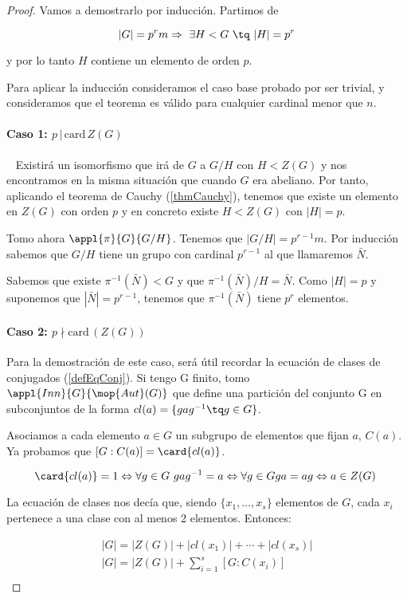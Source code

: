 \documentclass[nochap]{apuntes}
\begin{document}
\begin{proof}
 Vamos a demostrarlo por inducción. Partimos de

 \[ |G|=p^{r}m \Rightarrow \ \exists H < G \ \tq \ |H|=p^{r} \]

 y por lo tanto $H$ contiene un elemento de orden $p$.

 Para aplicar la inducción consideramos el caso base probado por ser trivial, y consideramos que el teorema es válido para cualquier cardinal menor que $n$.
\paragraph{Caso 1: $p\,|\, \mathrm{card}\, Z(G)$}  \pbreak
     Existirá un isomorfismo que irá de $G$ a $G/H$ con $H < Z(G)$ y nos encontramos en la misma situación que cuando $G$ era abeliano.
    Por tanto, aplicando el teorema de Cauchy (\ref{thmCauchy}), tenemos que existe un elemento en $Z(G)$ con orden $p$ y en concreto existe $H < Z(G)$ con $|H|=p$.

    Tomo ahora $\appl{\pi}{G}{G/H}$. Tenemos que $|G/H|=p^{r-1}m$. Por inducción sabemos que $G/H$ tiene un grupo con cardinal $p^{r-1}$ al que llamaremos $\bar{N}$.

    Sabemos que existe $\pi^{-1}(\bar{N}) < G$  y que $\pi^{-1}(\bar{N}) /H=\bar{N}$. Como $|H|=p$ y suponemos que $|\bar{N}|=p^{r-1}$, tenemos que $\pi^{-1}(\bar{N})$ tiene $p^{r}$  elementos.

\paragraph{Caso 2: $p \nmid   \mathrm{card}\, (Z(G))$} \pbreak
  Para la demostración de este caso, será útil recordar la ecuación de clases de conjugados (\ref{defEqConj}). Si tengo G finito, tomo $\appl{Inn}{G}{\mop{Aut}(G)}$  que define una partición del conjunto G en subconjuntos de la forma $cl(a)=\{gag^{-1} \tq g\in G\}$.

  Asociamos a cada elemento $a \in G$ un subgrupo de elementos que fijan $a$, $C(a)$. Ya probamos que $[G:C(a)]=\card{cl(a)}$.

  \[ \card{cl(a)}=1 \Leftrightarrow \forall g\in G \ gag^{-1}=a \Leftrightarrow \forall g \in G ga=ag \Leftrightarrow a \in Z(G) \]

  La ecuación de clases nos decía que, siendo $\{ x_1, \hdots, x_s \}$ elementos de $G$, cada $x_i$ pertenece a una clase con al menos 2 elementos. Entonces:

  \begin{gather*}
  |G| = |Z(G)| + |cl(x_1)| + \dotsb + |cl(x_s)| \\
  |G| = |Z(G)| + \sum_{i=1}^{s}[G:C(x_i)] \\
  \end{gather*}


\end{proof}
\end{document}
